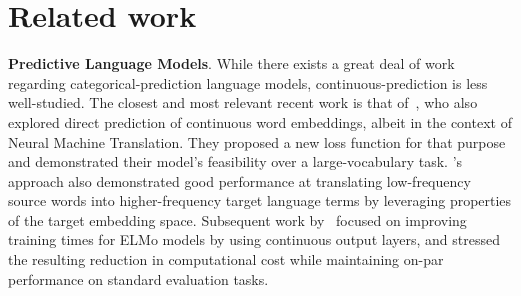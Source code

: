 \documentclass[11pt,a4paper]{article}
\begin{document}



\section{Related work}\label{work}

\textbf{Predictive Language Models}. While there exists a great deal of work regarding categorical-prediction language models, continuous-prediction is less well-studied. 
The closest and most relevant recent work is that of~\citet{kumar2018mises}, who also explored direct prediction of continuous word embeddings, albeit in the context of Neural Machine Translation. 
They proposed a new loss function for that purpose and demonstrated their model's feasibility over a large-vocabulary task.
\citeauthor{kumar2018mises}'s approach also demonstrated good performance at translating low-frequency source words into higher-frequency target language terms by leveraging properties of the target embedding space. 
Subsequent work by~\citet{li2019efficient} focused on improving training times for ELMo models by using continuous output layers, and stressed the resulting reduction in computational cost while maintaining on-par performance on standard evaluation tasks. 
\end{document}
